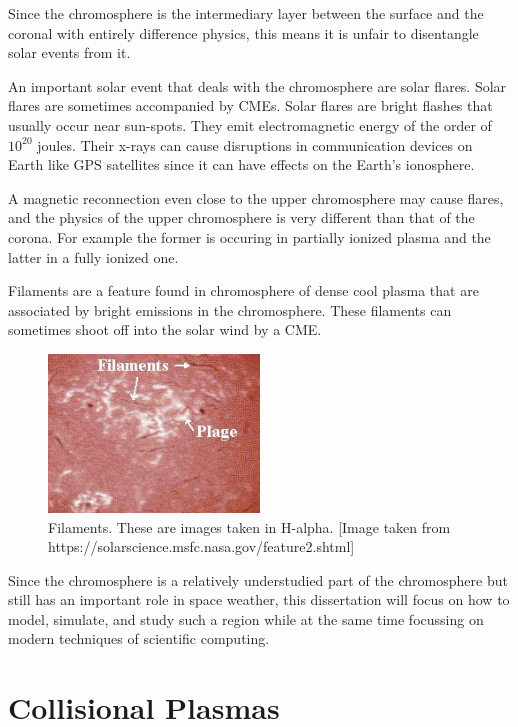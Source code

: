 \documentclass[12pt,upcase]{umlthesis}
\begin{document}
Since the chromosphere is the intermediary layer between the surface and the coronal with entirely difference physics, this means it is unfair to disentangle solar events from it.

An important solar event that deals with the chromosphere are solar flares. Solar flares are sometimes accompanied by CMEs. Solar flares are bright flashes that usually occur near sun-spots. They emit electromagnetic energy of the order of $10^{20}$ joules. Their x-rays can cause disruptions in communication devices on Earth like GPS satellites since it can have effects on the Earth's ionosphere.

A magnetic reconnection even close to the upper chromosphere may cause flares, and the physics of the upper chromosphere is very different than that of the corona. For example the former is occuring in partially ionized plasma and the latter in a fully ionized one.

Filaments are a feature found in chromosphere of dense cool plasma that are associated by bright emissions in the chromosphere. These filaments can sometimes shoot off into the solar wind by a CME\@.

\begin{figure}[ht!]
	\centering
	\includegraphics[width=0.5\textwidth]{images/filament.jpg}
	\caption{Filaments. These are images taken in H-alpha. [Image taken from https://solarscience.msfc.nasa.gov/feature2.shtml]}\label{fig:filament} %
\end{figure}

Since the chromosphere is a relatively understudied part of the chromosphere but still has an important role in space weather, this dissertation will focus on how to model, simulate, and study such a region while at the same time focussing on modern techniques of scientific computing.


\chapter{Collisional Plasmas}\label{chap:plasma}
\end{document}
